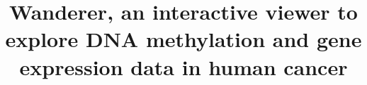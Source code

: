 \documentclass{bmcart}
\begin{document}
\begin{frontmatter}

\begin{fmbox}



\title{Wanderer, an interactive viewer to explore DNA methylation and gene expression data in human cancer}




\author[
   addressref={aff1,aff2},
   email={adiez@imppc.org},
   noteref={n1}
]{ }
\author[
   addressref={aff1,aff2},                   %
   noteref={n1},                        %
   email={imallona@imppc.org}   %
]{ }
\author[
   addressref={aff1,aff2},
   corref={aff1,aff2},
   email={mpeinado@imppc.org}
]{ }










\end{fmbox}
\end{frontmatter}
\end{document}
